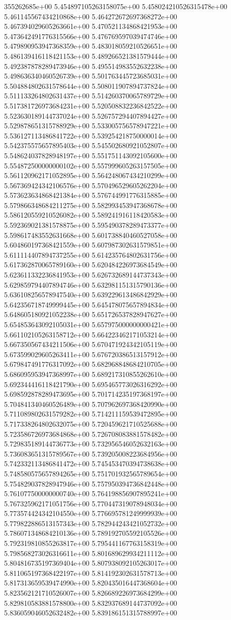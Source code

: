 355262685e+00	5.454897105263158075e+00	5.458024210526315478e+00	5.461145567434210868e+00	5.464272672697368272e+00	5.467394029605263661e+00	5.470521134868421953e+00	5.473642491776315566e+00	5.476769597039474746e+00	5.479890953947368359e+00	5.483018059210526651e+00	5.486139416118421153e+00	5.489266521381579444e+00	5.492387878289473946e+00	5.495514983552632238e+00	5.498636340460526739e+00	5.501763445723685031e+00	5.504884802631578644e+00	5.508011907894737824e+00	5.511133264802631437e+00	5.514260370065789729e+00	5.517381726973684231e+00	5.520508832236842522e+00	5.523630189144737024e+00	5.526757294407894427e+00	5.529878651315788929e+00	5.533005756578947221e+00	5.536127113486841722e+00	5.539254218750000014e+00	5.542375575657895403e+00	5.545502680921052807e+00	5.548624037828948197e+00	5.551751143092105600e+00	5.554872500000000102e+00	5.557999605263157505e+00	5.561120962171052895e+00	5.564248067434210299e+00	5.567369424342106576e+00	5.570496529605262204e+00	5.573623634868421384e+00	5.576744991776315885e+00	5.579866348684211275e+00	5.582993453947368678e+00	5.586120559210526082e+00	5.589241916118420583e+00	5.592369021381578875e+00	5.595490378289473377e+00	5.598617483552631668e+00	5.601738840460527058e+00	5.604860197368421559e+00	5.607987302631579851e+00	5.611114407894737255e+00	5.614235764802631756e+00	5.617362870065789160e+00	5.620484226973684549e+00	5.623611332236841953e+00	5.626732689144737343e+00	5.629859794407894746e+00	5.632981151315790136e+00	5.636108256578947540e+00	5.639229613486842929e+00	5.642356718749999445e+00	5.645478075657894834e+00	5.648605180921052238e+00	5.651726537828947627e+00	5.654853643092105031e+00	5.657975000000000421e+00	5.661102105263158712e+00	5.664223462171053214e+00	5.667350567434211506e+00	5.670471924342105119e+00	5.673599029605263411e+00	5.676720386513157912e+00	5.679847491776317092e+00	5.682968848684210705e+00	5.686095953947368997e+00	5.689217310855262610e+00	5.692344416118421790e+00	5.695465773026316292e+00	5.698592878289473695e+00	5.701714235197368197e+00	5.704841340460526489e+00	5.707962697368420990e+00	5.711089802631579282e+00	5.714211159539472895e+00	5.717338264802632075e+00	5.720459621710525688e+00	5.723586726973684868e+00	5.726708083881578482e+00	5.729835189144736773e+00	5.732956546052632163e+00	5.736083651315789567e+00	5.739205008223684956e+00	5.742332113486841472e+00	5.745453470394738638e+00	5.748580575657894265e+00	5.751701932565789654e+00	5.754829037828947946e+00	5.757950394736842448e+00	5.761077500000000740e+00	5.764198856907895241e+00	5.767325962171051756e+00	5.770447319078948034e+00	5.773574424342104550e+00	5.776695781249999939e+00	5.779822886513157343e+00	5.782944243421052732e+00	5.786071348684210136e+00	5.789192705592105526e+00	5.792319810855263817e+00	5.795441167763158319e+00	5.798568273026316611e+00	5.801689629934211112e+00	5.804816735197369404e+00	5.807938092105263017e+00	5.811065197368422197e+00	5.814192302631578713e+00	5.817313659539474990e+00	5.820435016447368604e+00	5.823562121710526007e+00	5.826689226973684299e+00	5.829810583881578800e+00	5.832937689144737092e+00	5.836059046052632482e+00	5.839186151315788997e+00
